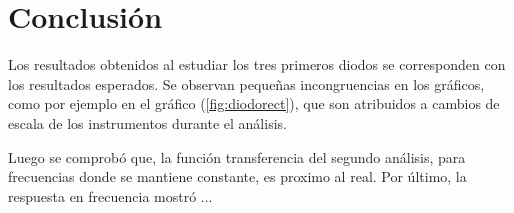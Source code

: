 \documentclass[a4paper]{article}
\begin{document}
\section*{Conclusión}

Los resultados obtenidos al estudiar los tres primeros diodos se corresponden con los resultados esperados. Se observan pequeñas incongruencias en los gráficos, como por ejemplo en el gráfico (\ref{fig:diodorect}), que son atribuidos a cambios de escala de los instrumentos durante el análisis.

Luego se comprobó que, la función transferencia del segundo análisis, para frecuencias donde se mantiene constante, es proximo al real.
Por último, la respuesta en frecuencia mostró ...
\end{document}

